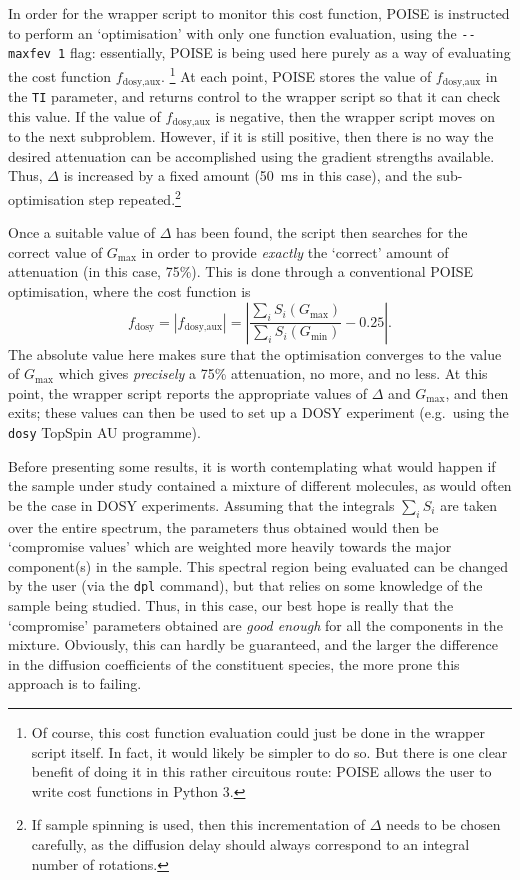 In order for the wrapper script to monitor this cost function, POISE is instructed to perform an `optimisation' with only one function evaluation, using the \texttt{-\phantom{}-maxfev 1} flag: essentially, POISE is being used here purely as a way of evaluating the cost function $f_\text{dosy,aux}$.%
\footnote{Of course, this cost function evaluation could just be done in the wrapper script itself. In fact, it would likely be simpler to do so. But there is one clear benefit of doing it in this rather circuitous route: POISE allows the user to write cost functions in Python 3.}
At each point, POISE stores the value of $f_\text{dosy,aux}$ in the \texttt{TI} parameter, and returns control to the wrapper script so that it can check this value.
If the value of $f_\text{dosy,aux}$ is negative, then the wrapper script moves on to the next subproblem.
However, if it is still positive, then there is no way the desired attenuation can be accomplished using the gradient strengths available.
Thus, $\Delta$ is increased by a fixed amount (\qty{50}{\ms} in this case), and the sub-optimisation step repeated.\footnote{If sample spinning is used, then this incrementation of $\Delta$ needs to be chosen carefully, as the diffusion delay should always correspond to an integral number of rotations.}

Once a suitable value of $\Delta$ has been found, the script then searches for the correct value of $G_\text{max}$ in order to provide \textit{exactly} the `correct' amount of attenuation (in this case, 75\%).
This is done through a conventional POISE optimisation, where the cost function is
\begin{equation}
    \label{eq:dosy_cf}
    f_\text{dosy} = |f_\text{dosy,aux}| = \left| \frac{\sum_i S_i(G_\text{max})}{\sum_i S_i(G_\text{min})} - 0.25 \right|.
\end{equation}
The absolute value here makes sure that the optimisation converges to the value of $G_\text{max}$ which gives \textit{precisely} a 75\% attenuation, no more, and no less.
At this point, the wrapper script reports the appropriate values of $\Delta$ and $G_\text{max}$, and then exits; these values can then be used to set up a DOSY experiment (e.g.\ using the \texttt{dosy} TopSpin AU programme).

Before presenting some results, it is worth contemplating what would happen if the sample under study contained a mixture of different molecules, as would often be the case in DOSY experiments.
Assuming that the integrals $\sum_i S_i$ are taken over the entire spectrum, the parameters thus obtained would then be `compromise values' which are weighted more heavily towards the major component(s) in the sample.
This spectral region being evaluated can be changed by the user (via the \texttt{dpl} command), but that relies on some knowledge of the sample being studied.
Thus, in this case, our best hope is really that the `compromise' parameters obtained are \textit{good enough} for all the components in the mixture.
Obviously, this can hardly be guaranteed, and the larger the difference in the diffusion coefficients of the constituent species, the more prone this approach is to failing.


